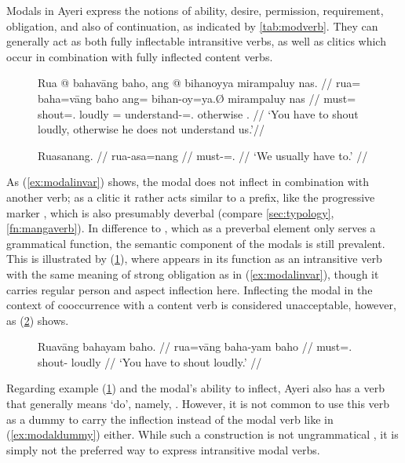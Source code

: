 Modals in Ayeri express the notions of ability, desire, permission,
requirement, obligation, and also of continuation, as indicated by
\autoref{tab:modverb}. They can generally act as both fully inflectable
intransitive verbs, as well as clitics which occur in combination with fully
inflected content verbs.

\begin{figure}[h]
\pex
\a\label{ex:modalinvar}\begingl
	\gla Rua @ bahavāng baho, ang @ bihanoyya mirampaluy nas. //
	\glb rua= baha=vāng baho ang= bihan-oy=ya.Ø mirampaluy nas //
	\glc must= shout=\Second{}.\Aarg{} loudly \AgtT{}= 
		understand-\Neg{}=\TsgM{}.\Top{} otherwise \Fpl{}.\Parg{} //
	\glft `You have to shout loudly, otherwise he does not understand 
		us.'//
\endgl

\a\label{ex:modalinfl}\begingl
	\gla Ruasanang. //
	\glb rua-asa=nang //
	\glc must-\Hab{}=\Fpl{}.\Aarg{} //
	\glft `We usually have to.' //
\endgl
\xe
\end{figure}

As (\ref{ex:modalinvar}) shows, the modal does not inflect in combination with
another verb; as a clitic it rather acts similar to a prefix, like the
progressive marker , which is also presumably deverbal
(compare \autoref{sec:typology}, \autoref{fn:mangaverb}). In difference to
, which as a preverbal element only serves a grammatical
function, the semantic component of the modals is still prevalent. This is
illustrated by (\ref{ex:modalinfl}), where  appears in its
function as an intransitive verb with the same meaning of strong obligation as
in (\ref{ex:modalinvar}), though it carries regular person and aspect
inflection here. Inflecting the modal in the context of cooccurrence with a
content verb is considered unacceptable, however, as (\ref{ex:modalinfl_2})
shows.

\begin{figure}[h]
\ex\label{ex:modalinfl_2}\ljudge*\begingl
	\gla Ruavāng bahayam baho. //
	\glb rua=vāng baha-yam baho //
	\glc must=\Second{}.\AgtT{} shout-\Ptcp{} loudly //
	\glft `You have to shout loudly.' //
\endgl\xe
\end{figure}

Regarding example (\ref{ex:modalinfl}) and the modal's ability to inflect,
Ayeri also has a verb that generally means `do', namely, .
However, it is not common to use this verb as a dummy to carry the inflection
instead of the modal verb like in (\ref{ex:modaldummy}) either. While such a
construction is not ungrammatical , it is simply not the preferred
way to express intransitive modal verbs.

